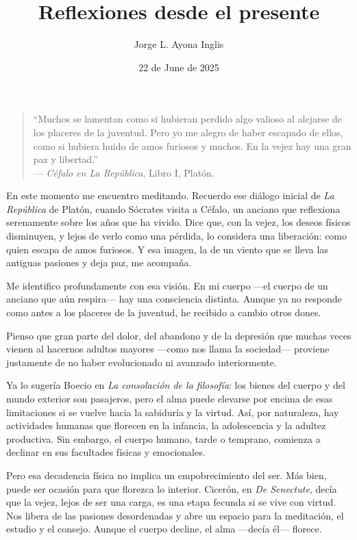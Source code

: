 \documentclass[12pt]{article}
\title{Reflexiones desde el presente}
\author{Jorge L. Ayona Inglis}
\date{22 de June de 2025}
\begin{document}
\maketitle

\begin{quote}
“Muchos se lamentan como si hubieran perdido algo valioso al alejarse de los placeres de la juventud. Pero yo me alegro de haber escapado de ellos, como si hubiera huido de amos furiosos y muchos. En la vejez hay una gran paz y libertad.”\\
--- \textit{Céfalo en La República}, Libro I, Platón.
\end{quote}

\onehalfspacing

En este momento me encuentro meditando. Recuerdo ese diálogo inicial de \textit{La República} de Platón, cuando Sócrates visita a Céfalo, un anciano que reflexiona serenamente sobre los años que ha vivido. Dice que, con la vejez, los deseos físicos disminuyen, y lejos de verlo como una pérdida, lo considera una liberación: como quien escapa de amos furiosos. Y esa imagen, la de un viento que se lleva las antiguas pasiones y deja paz, me acompaña.

Me identifico profundamente con esa visión. En mi cuerpo —el cuerpo de un anciano que aún respira— hay una consciencia distinta. Aunque ya no responde como antes a los placeres de la juventud, he recibido a cambio otros dones.

Pienso que gran parte del dolor, del abandono y de la depresión que muchas veces vienen al hacernos adultos mayores —como nos llama la sociedad— proviene justamente de no haber evolucionado ni avanzado interiormente.

Ya lo sugería Boecio en \textit{La consolación de la filosofía}: los bienes del cuerpo y del mundo exterior son pasajeros, pero el alma puede elevarse por encima de esas limitaciones si se vuelve hacia la sabiduría y la virtud. Así, por naturaleza, hay actividades humanas que florecen en la infancia, la adolescencia y la adultez productiva. Sin embargo, el cuerpo humano, tarde o temprano, comienza a declinar en sus facultades físicas y emocionales.

Pero esa decadencia física no implica un empobrecimiento del ser. Más bien, puede ser ocasión para que florezca lo interior. Cicerón, en \textit{De Senectute}, decía que la vejez, lejos de ser una carga, es una etapa fecunda si se vive con virtud. Nos libera de las pasiones desordenadas y abre un espacio para la meditación, el estudio y el consejo. Aunque el cuerpo decline, el alma —decía él— florece.
\end{document}
